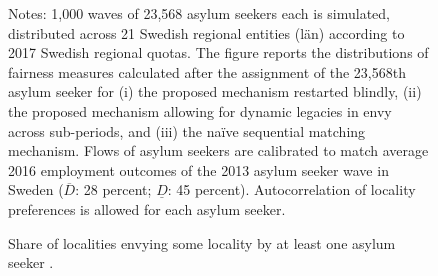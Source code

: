 \documentclass[12pt,fleqn]{article}
\begin{document}
\begin{figure}
	\caption{Share of localities envying some locality by at least one asylum seeker \label{FIG:quotas_fair0}.}
	\begin{center}
	\end{center}
		{\scriptsize \vspace{-1em}
	\begin{singlespace}
		{\sc Notes:} 1,000 waves of 23,568 asylum seekers each is simulated, distributed across 21 Swedish regional entities (l\"{a}n) according to 2017 Swedish regional quotas. The figure reports the distributions of fairness measures calculated after the assignment of the 23,568th asylum seeker for (i) the proposed mechanism restarted blindly, (ii) the proposed mechanism allowing for dynamic legacies in envy across sub-periods, and (iii) the na\"{i}ve sequential matching mechanism. Flows of asylum seekers are calibrated to match average 2016 employment outcomes of the 2013 asylum seeker wave in Sweden ($\overline{D}$: 28 percent; $\underline{D}$: 45 percent). Autocorrelation of locality preferences is allowed for each asylum seeker.
	\end{singlespace}
	 }
\end{figure}
\end{document}
